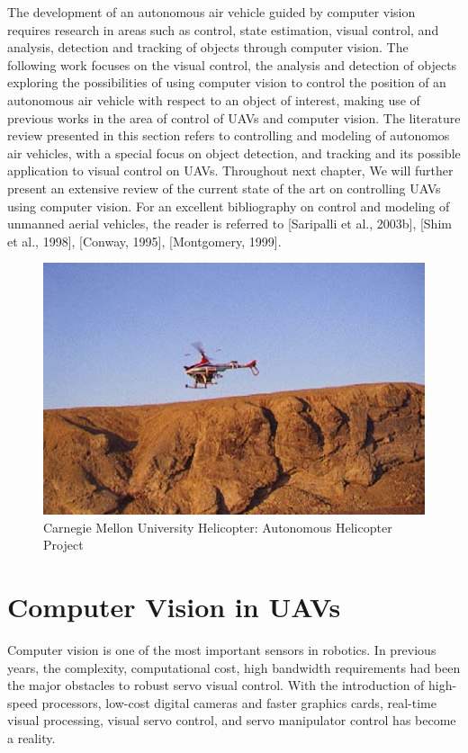 The development of an autonomous air vehicle  guided by computer vision requires research in areas such as control, state estimation, visual control, and analysis, detection and tracking of objects through computer vision. The following work focuses on the visual control, the analysis and detection of objects exploring the possibilities of using computer vision to control the position of an autonomous air vehicle with respect to an object of interest, making use of previous works in the area of control of UAVs and computer vision. The literature review presented in this section refers to controlling and modeling of autonomos air vehicles, with a special focus on object detection, and tracking and its possible application to visual control on UAVs. Throughout next chapter, We will further present an extensive review of the current state of the art on controlling UAVs using computer vision. For an excellent bibliography on control and modeling of unmanned aerial vehicles, the reader is referred to [Saripalli et al., 2003b], [Shim et al., 1998], [Conway, 1995], [Montgomery, 1999].
  

\begin{figure}[h!]
\centering
\includegraphics[scale=0.9]{figures/helicopter.png}
\caption{Carnegie Mellon University Helicopter: Autonomous Helicopter Project}
\label{automonous_drone}
\end{figure}

\section{Computer Vision in UAVs}

Computer vision is one of the most important sensors in robotics. In previous years, the complexity, computational cost, high bandwidth requirements had been the major obstacles to robust servo visual control. With the introduction of high-speed processors, low-cost digital cameras and faster graphics cards, real-time visual processing, visual servo control, and servo manipulator control has become a reality.

